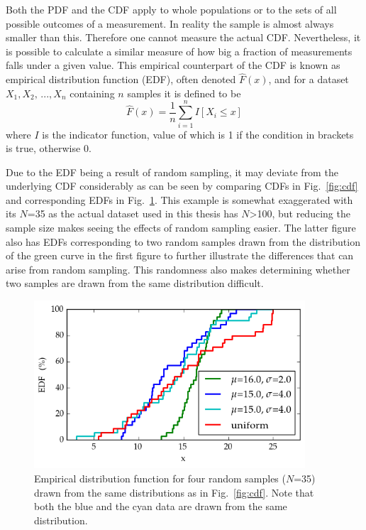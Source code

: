\documentclass[english, oneside]{HYgradu}
\begin{document}
Both the PDF and the CDF apply to whole populations or to the sets of all possible outcomes of a measurement. In reality the sample is almost always smaller than this. Therefore one cannot measure the actual CDF. Nevertheless, it is possible to calculate a similar measure of how big a fraction of measurements falls under a given value. This empirical counterpart of the CDF is known as empirical distribution function (EDF), often denoted $\hat F(x)$, and for a dataset $X_1, X_2,\,..., X_n$ containing $n$ samples it is defined to be
\begin{equation}
	\hat F(x) = \frac{1}{n}\sum_{i=1}^n I[X_i \leq x]
\end{equation}
where $I$ is the indicator function, value of which is 1 if the condition in brackets is true, otherwise 0. \citep{feigelson2012modern}

Due to the EDF being a result of random sampling, it may deviate from the underlying CDF considerably as can be seen by comparing CDFs in Fig.\ \ref{fig:cdf} and corresponding EDFs in Fig.\ \ref{fig:edf}. This example is somewhat exaggerated with its $N$=35 as the actual dataset used in this thesis has $N$>100, but reducing the sample size makes seeing the effects of random sampling easier. The latter figure also has EDFs corresponding to two random samples drawn from the distribution of the green curve in the first figure to further illustrate the differences that can arise from random sampling. This randomness also makes determining whether two samples are drawn from the same distribution difficult.

\begin{figure}
   \centering
   \includegraphics[width=0.9\textwidth]{kuvat/edf.png}
   \caption{Empirical distribution function for four random samples ($N$=35) drawn from the same distributions as in Fig.\ \ref{fig:cdf}. Note that both the blue and the cyan data are drawn from the same distribution.}
   \label{fig:edf}
\end{figure}
\end{document}
